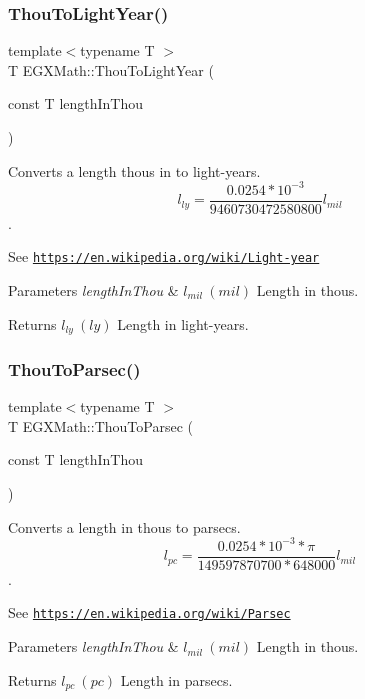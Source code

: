 \subsubsection{\texorpdfstring{Thou\+To\+Light\+Year()}{ThouToLightYear()}}
{\footnotesize\ttfamily template$<$typename T $>$ \\
T E\+G\+X\+Math\+::\+Thou\+To\+Light\+Year (\begin{DoxyParamCaption}\item[{const T}]{length\+In\+Thou }\end{DoxyParamCaption})}



Converts a length thous in to light-\/years. \[ l_{ly}=\frac{0.0254 * 10^{-3}}{9460730472580800} l_{mil} \]. 

See \href{https://en.wikipedia.org/wiki/Light-year}{\tt https\+://en.\+wikipedia.\+org/wiki/\+Light-\/year} 
\begin{DoxyParams}{Parameters}
{\em length\+In\+Thou} & $ l_{mil}\ (mil)$ Length in thous. \\
\hline
\end{DoxyParams}
\begin{DoxyReturn}{Returns}
$ l_{ly}\ (ly)$ Length in light-\/years. 
\end{DoxyReturn}
\mbox{\label{group___e_g_x_math-_conversions-_length_conversions-_imperial-_thou-_astronomical_gaa2a5b00bb5a83ba8f22f9c2f15ecc112}} 
\subsubsection{\texorpdfstring{Thou\+To\+Parsec()}{ThouToParsec()}}
{\footnotesize\ttfamily template$<$typename T $>$ \\
T E\+G\+X\+Math\+::\+Thou\+To\+Parsec (\begin{DoxyParamCaption}\item[{const T}]{length\+In\+Thou }\end{DoxyParamCaption})}



Converts a length in thous to parsecs. \[ l_{pc}=\frac{0.0254 * 10^{-3} * \pi}{149597870700 * 648000} l_{mil} \]. 

See \href{https://en.wikipedia.org/wiki/Parsec}{\tt https\+://en.\+wikipedia.\+org/wiki/\+Parsec} 
\begin{DoxyParams}{Parameters}
{\em length\+In\+Thou} & $ l_{mil}\ (mil)$ Length in thous. \\
\hline
\end{DoxyParams}
\begin{DoxyReturn}{Returns}
$ l_{pc}\ (pc)$ Length in parsecs. 
\end{DoxyReturn}
